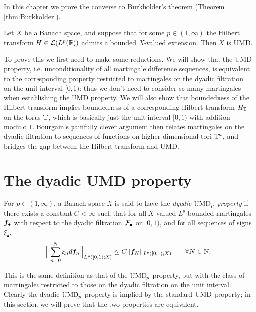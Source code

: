 In this chapter we prove the converse to Burkholder's theorem (Theorem \ref{thm:Burkholder}).

\begin{thm}[Bourgain]\label{thm:Bourgain}
  Let $X$ be a Banach space, and suppose that for some $p \in (1,\infty)$ the Hilbert transform $H \in \mathcal{L}(L^p(\mathbb{R}))$ admits a bounded $X$-valued extension.
  Then $X$ is UMD.
\end{thm}

To prove this we first need to make some reductions.
We will show that the UMD property, i.e. unconditionality of all martingale difference sequences, is equivalent to the corresponding property restricted to martingales on the dyadic filtration on the unit interval $[0,1)$: thus we don't need to consider so many martingales when establishing the UMD property.
We will also show that boundedness of the Hilbert transform implies boundedness of a corresponding Hilbert transform $H_{\mathbb{T}}$ on the torus $\mathbb{T}$, which is basically just the unit interval $[0,1)$ with addition modulo $1$.
Bourgain's painfully clever argument then relates martingales on the dyadic filtration to sequences of functions on higher dimensional tori $\mathbb{T}^{n}$, and bridges the gap between the Hilbert transform and UMD.

\section{The dyadic UMD property}


\begin{defn}
  For $p \in (1,\infty)$, a Banach space $X$ is said to have the \emph{dyadic $\mathrm{UMD}_{p}$ property} if there exists a constant $C < \infty$ such that for all $X$-valued $L^p$-bounded martingales $\bm{f}_{\bullet}$ with respect to the dyadic filtration $\mathcal{F}_{\bullet}$ on $[0,1)$, and for all sequences of signs $\xi_{\bullet}$,
  \begin{equation}\label{eq:dyadic-UMD-property}
    \Big\| \sum_{n=0}^{N} \xi_{n} d\bm{f}_{n} \Big\|_{L^p([0,1);X)} \leq C \| \bm{f}_{N}\|_{L^p([0,1);X)} \qquad \forall N \in \mathbb{N}.
  \end{equation}
\end{defn}

This is the same definition as that of the $\mathrm{UMD}_{p}$ property, but with the class of martingales restricted to those on the dyadic filtration on the unit interval.
Clearly the dyadic $\mathrm{UMD}_{p}$ property is implied by the standard $\mathrm{UMD}$ property; in this section we will prove that the two properties are equivalent.

